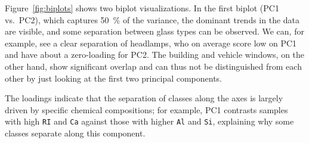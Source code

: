 \documentclass[dtu]{dtuarticle}
\begin{document}
	Figure~\ref{fig:biplots} shows two biplot visualizations. In the first biplot (PC1 vs.\ PC2), which captures \SI{50}{\percent} of the variance, the dominant trends in the data are visible, and some separation between glass types can be observed. We can, for example, see a clear separation of headlamps, who on average score low on PC1 and have about a zero-loading for PC2. The building and vehicle windows, on the other hand, show significant overlap and can thus not be distinguished from each other by just looking at the first two principal components.

	The loadings indicate that the separation of classes along the axes is largely driven by specific chemical compositions; for example, PC1 contrasts samples with high \texttt{RI} and \texttt{Ca} against those with higher \texttt{Al} and \texttt{Si}, explaining why some classes separate along this component.
\end{document}
